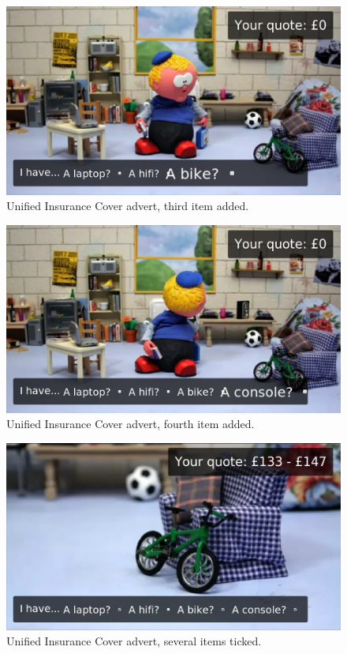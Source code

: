 	\begin{figure}[th]
		\centering
		\includegraphics[width=\textwidth,height=0.5\textheight,keepaspectratio]{images/adverts/unified_insurance_cover-4.png}
		\caption{Unified Insurance Cover advert, third item added.}
		\label{fig:Paddy4}
	\end{figure}
	
	\begin{figure}[th]
		\centering
		\includegraphics[width=\textwidth,height=0.5\textheight,keepaspectratio]{images/adverts/unified_insurance_cover-5.png}
		\caption{Unified Insurance Cover advert, fourth item added.}
		\label{fig:Paddy5}
	\end{figure}
	
	\begin{figure}[th]
		\centering
		\includegraphics[width=\textwidth,height=0.5\textheight,keepaspectratio]{images/adverts/unified_insurance_cover-6.png}
		\caption{Unified Insurance Cover advert, several items ticked.}
		\label{fig:Paddy6}
	\end{figure}
	
